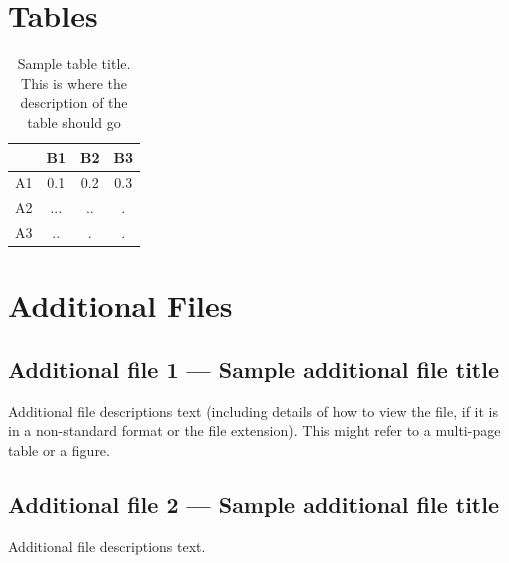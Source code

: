 \documentclass{bmcart}
\begin{document}
\begin{backmatter}

\section*{Tables}
\begin{table}[h!]
\caption{Sample table title. This is where the description of the table should go}
  \begin{tabular}{cccc}
    \hline
    & B1  &B2   & B3\\ \hline
    A1 & 0.1 & 0.2 & 0.3\\
    A2 & ... & ..  & .\\
    A3 & ..  & .   & .\\ \hline
  \end{tabular}
\end{table}


\section*{Additional Files}
  \subsection*{Additional file 1 --- Sample additional file title}
    Additional file descriptions text (including details of how to
    view the file, if it is in a non-standard format or the file extension).  This might
    refer to a multi-page table or a figure.

  \subsection*{Additional file 2 --- Sample additional file title}
    Additional file descriptions text.

\end{backmatter}
\end{document}
